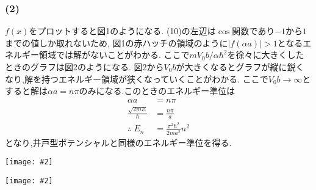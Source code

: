 \documentclass[uplatex,a4j,11pt,dvipdfmx]{jsarticle}
\makeatletter
\def\fgcaption{\def\@captype{figure}\caption}
\newcommand{\mfig}[3][width=15cm]{
\begin{center}
\texttt{[image: \#2]}
\fgcaption{#3 \label{fig:#2}}
\end{center}
}
\makeatother
\begin{document}
\subsubsection*{(2)}
$f(x)$をプロットすると図1のようになる.
(10)の左辺は$\cos$関数であり$-1$から$1$までの値しか取れないため,
図1の赤ハッチの領域のように$|f(\alpha a)|>1$となるエネルギー領域では解がないことがわかる.
ここで${mV_0b}/{\alpha\hbar^2}$を徐々に大きくしたときのグラフは図2のようになる.
図2から$V_0b$が大きくなるとグラフが縦に鋭くなり,解を持つエネルギー領域が狭くなっていくことがわかる.
ここで$V_0b\rightarrow\infty$とすると解は$\alpha a=n\pi$のみになる.このときのエネルギー準位は
\begin{align}
  \alpha a&=n\pi\nonumber\\
  \frac{\sqrt{2mE}}{\hbar}&=\frac{n\pi}{a}\nonumber\\
  \therefore\ E_n&=\frac{\pi^2\hbar^2}{2ma^2}n^2
\end{align}
となり,井戸型ポテンシャルと同様のエネルギー準位を得る.
\mfig[width=10cm]{fig/materialNo2-1.png}{$f(x)$のグラフ(${mV_0b}/{\alpha\hbar^2}=1$のとき)}
\mfig[width=10cm]{fig/materialNo2-2.png}{$f(x)$のグラフ(青→緑→赤の順で${mV_0b}/{\alpha\hbar^2}$が大きい)}
\end{document}
